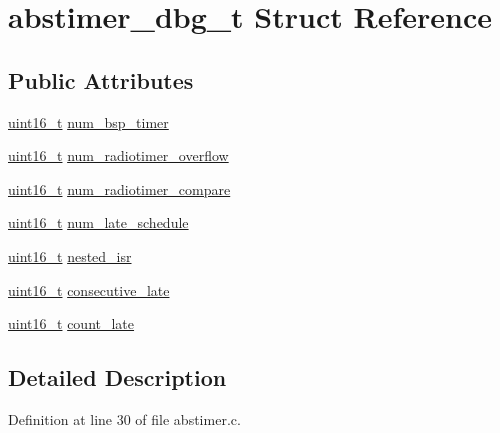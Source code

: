 \hypertarget{structabstimer__dbg__t}{}\section{abstimer\+\_\+dbg\+\_\+t Struct Reference}
\label{structabstimer__dbg__t}
\subsection*{Public Attributes}
\begin{DoxyCompactItemize}
\item 
\hyperlink{_p_e___types_8h_a1f1825b69244eb3ad2c7165ddc99c956}{uint16\+\_\+t} \hyperlink{structabstimer__dbg__t_a62760a47e0b9b9b9e01298e521a16263}{num\+\_\+bsp\+\_\+timer}
\item 
\hyperlink{_p_e___types_8h_a1f1825b69244eb3ad2c7165ddc99c956}{uint16\+\_\+t} \hyperlink{structabstimer__dbg__t_a9c8f94ef8ac20c0c5e1da1126c0c233a}{num\+\_\+radiotimer\+\_\+overflow}
\item 
\hyperlink{_p_e___types_8h_a1f1825b69244eb3ad2c7165ddc99c956}{uint16\+\_\+t} \hyperlink{structabstimer__dbg__t_a4562acb4e2448d20b7689573eb0576f1}{num\+\_\+radiotimer\+\_\+compare}
\item 
\hyperlink{_p_e___types_8h_a1f1825b69244eb3ad2c7165ddc99c956}{uint16\+\_\+t} \hyperlink{structabstimer__dbg__t_a3c612a828b353e34d8bf1198dad4ac87}{num\+\_\+late\+\_\+schedule}
\item 
\hyperlink{_p_e___types_8h_a1f1825b69244eb3ad2c7165ddc99c956}{uint16\+\_\+t} \hyperlink{structabstimer__dbg__t_a4902ccb8295dc60e5368a02ec6a39acc}{nested\+\_\+isr}
\item 
\hyperlink{_p_e___types_8h_a1f1825b69244eb3ad2c7165ddc99c956}{uint16\+\_\+t} \hyperlink{structabstimer__dbg__t_a36c6f4adfad45443c71dfe5d2600a246}{consecutive\+\_\+late}
\item 
\hyperlink{_p_e___types_8h_a1f1825b69244eb3ad2c7165ddc99c956}{uint16\+\_\+t} \hyperlink{structabstimer__dbg__t_aaff028d3e53cb25b7c66e071f47e9047}{count\+\_\+late}
\end{DoxyCompactItemize}


\subsection{Detailed Description}


Definition at line 30 of file abstimer.\+c.



